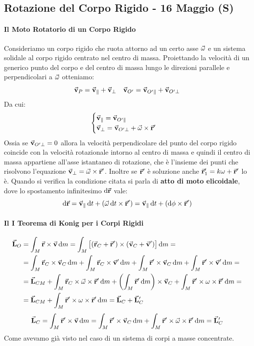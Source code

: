 \documentclass{article}
\newcommand{\note}{\noindent {\quad \bf \underline{Osservazione:}} \quad}
\renewcommand{\v}{\va{v}}
\renewcommand{\r}{\va{r}}
\renewcommand{\L}{\va{L}}
\begin{document}
\subsection{Rotazione del Corpo Rigido - 16 Maggio (S)}
\paragraph{Il Moto Rotatorio di un Corpo Rigido}
Consideriamo un corpo rigido che ruota attorno ad un certo asse $\va{\omega}$ e un sistema solidale al corpo rigido centrato nel centro di massa. Proiettando la velocità di un generico punto del corpo e del centro di massa lungo le direzioni parallele e perpendicolari a $\va{\omega}$ otteniamo:
\[\v_P=\v_{\parallel}+\v_\perp\quad\v_{O'}=\v_{O'\parallel}+\v_{O'\perp}\]
Da cui:
\begin{equation}
\begin{cases}
\v_{\parallel}=\v_{O'\parallel}\\
\v_{\perp}=\v_{O'\perp}+\va{\omega}\times\r'
\end{cases}
\end{equation}
Ossia se $\v_{O'\perp}=0$ allora la velocità perpendicolare del punto del corpo rigido coincide con la velocità rotazionale intorno al centro di massa e quindi il centro di massa appartiene all'asse istantaneo di rotazione, che è l'insieme dei punti che risolvono l'equazione $\v_{\perp}=\va{\omega}\times\r'$. Inoltre se $\r'$ è soluzione anche $\r_1'=k\omega+\r'$ lo è.
Quando si verifica la condizione citata si parla di \textbf{atto di moto elicoidale}, dove lo spostamento infinitesimo $\dif\r$ vale:
\begin{equation}
    \dif\r=\v_{\parallel}\dif t+(\va{\omega}\dif t\times\r')=\v_{\parallel}\dif t+(\dif\phi\times\r')
\end{equation}
\paragraph{Il I Teorema di Konig per i Corpi Rigidi}
\begin{equation}
\begin{split}
    \L_O&=\int_M\r\times\v\dif m=\int_M\left[(\r_C+\r')\times(\v_C+\v')\right]\dif m=\\
    &=\int_M\r_C\times\v_C\dif m+\int_M\r_C\times\v'\dif m+\int_M\r'\times\v_C\dif m+\int_M\r'\times\v'\dif m=\\
    &=\L_{CM}+\int_M\r_C\times\va{\omega}\times\r'\dif m+\left(\int_M\r'\dif m\right)\times\v_C+\int_M\r'\times\omega\times\r'\dif m=\\
    &=\L_{CM}+\int_M\r'\times\omega\times\r'\dif m=\L_C+\L_C'
\end{split}
\end{equation}
\note 
\[\L_C=\int_M\r'\times\v\dif m=\int_M\r'\times\v_C\dif m+\int_M\r'\times\va{\omega}\times\r'\dif m=\L_C'\]
Come avevamo già visto nel caso di un sistema di corpi a masse concentrate.\\
\end{document}

